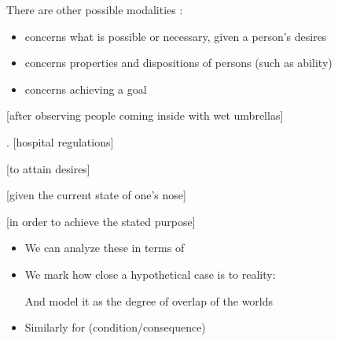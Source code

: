 \documentclass[a4paper,landscape,headrule,footrule,xetex]{foils}
\begin{document}

There are other possible modalities \citep[p290 (4)]{Kroeger:2022}:
\begin{itemize}
\item {} concerns what is possible or necessary,
given a person's desires
\item {} concerns properties and dispositions of persons (such as ability)
\item {} concerns achieving a goal 
\end{itemize}

\begin{exe}
\item {}
   [after observing people coming inside with wet umbrellas] 
 \item {}.
   [hospital regulations] 
 \item {}
   [to attain desires] 
 \item {}
   [given the current state of one's nose] 
 \item {}
   [in order to achieve the stated purpose] 
\end{exe}

\begin{itemize}
\item We can analyze these in terms of 

\item We mark how close a hypothetical case is to reality:
  \begin{exe}
    \ex {}
  \end{exe}
  And model it as the degree of overlap of the worlds
\item Similarly for  (condition/consequence)
  \begin{exe}
    \ex {}
    \ex {}
    \ex {}
  \end{exe}
\end{itemize}
\end{document}
